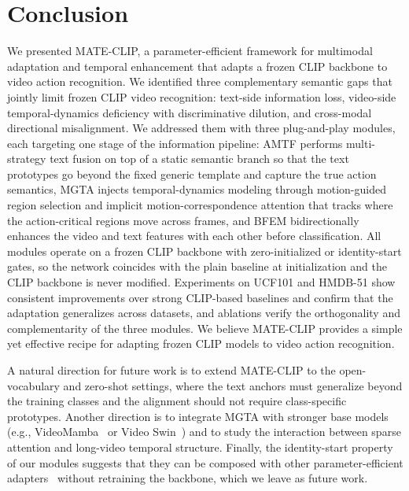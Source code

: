 \section{Conclusion}
\label{sec:conclusion}
We presented MATE-CLIP, a parameter-efficient framework for multimodal adaptation and temporal enhancement that adapts a frozen CLIP backbone to video action recognition.
We identified three complementary semantic gaps that jointly limit frozen CLIP video recognition: text-side information loss, video-side temporal-dynamics deficiency with discriminative dilution, and cross-modal directional misalignment.
We addressed them with three plug-and-play modules, each targeting one stage of the information pipeline: AMTF performs multi-strategy text fusion on top of a static semantic branch so that the text prototypes go beyond the fixed generic template and capture the true action semantics, MGTA injects temporal-dynamics modeling through motion-guided region selection and implicit motion-correspondence attention that tracks where the action-critical regions move across frames, and BFEM bidirectionally enhances the video and text features with each other before classification.
All modules operate on a frozen CLIP backbone with zero-initialized or identity-start gates, so the network coincides with the plain baseline at initialization and the CLIP backbone is never modified.
Experiments on UCF101 and HMDB-51 show consistent improvements over strong CLIP-based baselines and confirm that the adaptation generalizes across datasets, and ablations verify the orthogonality and complementarity of the three modules.
We believe MATE-CLIP provides a simple yet effective recipe for adapting frozen CLIP models to video action recognition.

A natural direction for future work is to extend MATE-CLIP to the open-vocabulary and zero-shot settings, where the text anchors must generalize beyond the training classes and the alignment should not require class-specific prototypes.
Another direction is to integrate MGTA with stronger base models (e.g., VideoMamba~\cite{liu2024video_mamba} or Video Swin~\cite{liu2022video_swin}) and to study the interaction between sparse attention and long-video temporal structure.
Finally, the identity-start property of our modules suggests that they can be composed with other parameter-efficient adapters~\cite{hu2022lora,pan2022st_adapter} without retraining the backbone, which we leave as future work.
